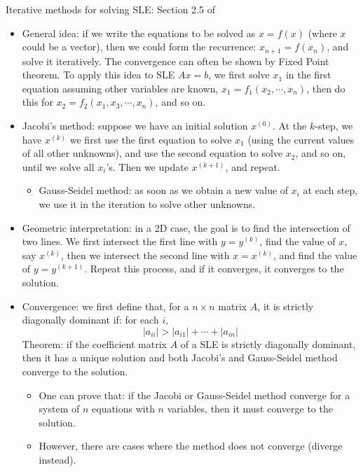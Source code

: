 \documentclass{report}
\begin{document}
Iterative methods for solving SLE: Section 2.5 of \cite{Poole06}
\begin{itemize}
\item General idea: if we write the equations to be solved as $x = f(x)$ (where $x$ could be a vector), then we could form the recurrence: $x_{n+1} = f(x_n)$, and solve it iteratively. The convergence can often be shown by Fixed Point theorem. To apply this idea to SLE $Ax = b$, we first solve $x_1$ in the first equation assuming other variables are known, $x_1 = f_1(x_2, \cdots, x_n)$, then do this for $x_2 = f_2(x_1, x_3, \cdots, x_n)$, and so on. 

\item Jacobi's method: suppose we have an initial solution $x^{(0)}$. At the $k$-step, we have $x^{(k)}$ we first use the first equation to solve $x_1$ (using the current values of all other unknowns), and use the second equation to solve $x_2$, and so on, until we solve all $x_i$'s. Then we update $x^{(k+1)}$, and repeat. 
\begin{itemize}
\item Gauss-Seidel method: as soon as we obtain a new value of $x_i$ at each step, we use it in the iteration to solve other unknowns. 
\end{itemize}

\item Geometric interpretation: in a 2D case, the goal is to find the intersection of two lines. We first intersect the first line with $y = y^{(k)}$, find the value of $x$, say $x^{(k)}$, then we intersect the second line with $x=x^{(k)}$, and find the value of $y = y^{(k+1)}$. Repeat this process, and if it converges, it converges to the solution. 

\item Convergence: we first define that, for a $n \times n$ matrix $A$, it is strictly diagonally dominant if: for each $i$, 
\begin{equation}
|a_{ii}| > |a_{i1}|	+ \cdots + |a_{in}|
\end{equation}
Theorem: if the coefficient matrix $A$ of a SLE is strictly diagonally dominant, then it has a unique solution and both Jacobi's and Gauss-Seidel method converge to the solution. 
\begin{itemize}
\item One can prove that: if the Jacobi or Gauss-Seidel method converge for a system of $n$ equations with $n$ variables, then it must converge to the solution. 
\item However, there are cases where the method does not converge (diverge instead). 
\end{itemize}


\end{itemize}
\end{document}
